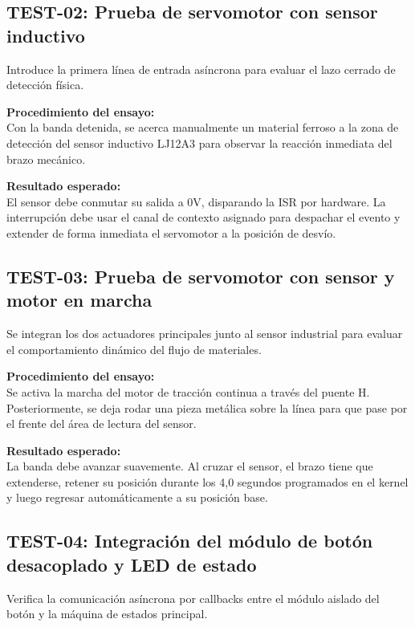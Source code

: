 \documentclass[12pt, letterpaper]{article}
\begin{document}
\subsection{TEST-02: Prueba de servomotor con sensor inductivo}
Introduce la primera línea de entrada asíncrona para evaluar el lazo cerrado de detección física.

\vspace{0.5cm}

\noindent \textbf{Procedimiento del ensayo:} \\
Con la banda detenida, se acerca manualmente un material ferroso a la zona de detección del sensor inductivo LJ12A3 para observar la reacción inmediata del brazo mecánico.

\vspace{0.5cm}

\noindent \textbf{Resultado esperado:} \\
El sensor debe conmutar su salida a 0V, disparando la ISR por hardware. La interrupción debe usar el canal de contexto asignado para despachar el evento y extender de forma inmediata el servomotor a la posición de desvío.

\subsection{TEST-03: Prueba de servomotor con sensor y motor en marcha}
Se integran los dos actuadores principales junto al sensor industrial para evaluar el comportamiento dinámico del flujo de materiales.

\vspace{0.5cm}

\noindent \textbf{Procedimiento del ensayo:} \\
Se activa la marcha del motor de tracción continua a través del puente H. Posteriormente, se deja rodar una pieza metálica sobre la línea para que pase por el frente del área de lectura del sensor.

\vspace{0.5cm}

\noindent \textbf{Resultado esperado:} \\
La banda debe avanzar suavemente. Al cruzar el sensor, el brazo tiene que extenderse, retener su posición durante los 4,0 segundos programados en el kernel y luego regresar automáticamente a su posición base.

\subsection{TEST-04: Integración del módulo de botón desacoplado y LED de estado}
Verifica la comunicación asíncrona por callbacks entre el módulo aislado del botón y la máquina de estados principal.
\end{document}
